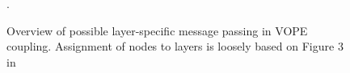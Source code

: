 \begin{figure}
  \centering

  \small

  \newcommand{\w}[1]{\textcolor{white}{#1}}
  \def\svgwidth{0.9\textwidth}


  \caption{Overview of possible layer-specific message passing in \textsf{VOPE} coupling. Assignment of nodes to layers is loosely based on Figure 3 in \cite{Shipp2016}}.
  \label{\figlabel}
\end{figure}